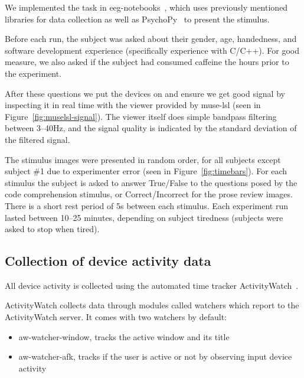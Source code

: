             We implemented the task in eeg-notebooks~\cite{barachant_eeg-notebooks_2020}, which uses previously mentioned libraries for data collection as well as PsychoPy~\cite{peirce_psychopy2_2019} to present the stimulus.

            Before each run, the subject was asked about their gender, age, handedness, and software development experience (specifically experience with C/C++). For good measure, we also asked if the subject had consumed caffeine the hours prior to the experiment.

            After these questions we put the devices on and ensure we get good signal by inspecting it in real time with the viewer provided by muse-lsl (seen in Figure~\ref{fig:muselsl-signal}). The viewer itself does simple bandpass filtering between 3--40Hz, and the signal quality is indicated by the standard deviation of the filtered signal.

            The stimulus images were presented in random order, for all subjects except subject \#1 due to experimenter error (seen in Figure~\ref{fig:timebars}). For each stimulus the subject is asked to answer True/False to the questions posed by the code comprehension stimulus, or Correct/Incorrect for the prose review images. There is a short rest period of 5s between each stimulus. Each experiment run lasted between 10--25 minutes, depending on subject tiredness (subjects were asked to stop when tired).

    \vfill
    \pagebreak
    \subsection{Collection of device activity data}\label{section:collect-usage}

        All device activity is collected using the automated time tracker ActivityWatch~\cite{bjareholt_activitywatch_2020-1}.

        \begin{minipage}{\textwidth}
        ActivityWatch collects data through modules called watchers which report to the ActivityWatch server. It comes with two watchers by default:

        \begin{itemize}
            \item aw-watcher-window, tracks the active window and its title
            \item aw-watcher-afk, tracks if the user is active or not by observing input device activity
        \end{itemize}
        \end{minipage}

